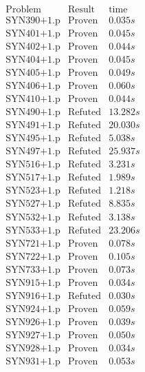 \documentclass[a4paper,11pt]{report}
\theoremstyle{definition}
\theoremstyle{definition}
\theoremstyle{definition}
\theoremstyle{definition}
\theoremstyle{definition}
\theoremstyle{definition}
\theoremstyle{definition}
\begin{document}
	\begin{minipage}{0.45\textwidth}
		\vspace*{-1.5cm}\[\begin{matrix}
			\text{Problem}&\text{Result}&\text{time}\\
			\text{SYN390+1.p}&\text{Proven}& 0.035 s\\
			\text{SYN401+1.p}&\text{Proven}& 0.045 s\\
			\text{SYN402+1.p}&\text{Proven}& 0.044 s\\
			\text{SYN404+1.p}&\text{Proven}& 0.045 s\\
			\text{SYN405+1.p}&\text{Proven}& 0.049 s\\
			\text{SYN406+1.p}&\text{Proven}& 0.060 s\\
			\text{SYN410+1.p}&\text{Proven}& 0.044 s\\
			\text{SYN490+1.p}&\text{Refuted}& 13.282 s\\
			\text{SYN491+1.p}&\text{Refuted}& 20.030 s\\
			\text{SYN495+1.p}&\text{Refuted}& 5.038 s\\
			\text{SYN497+1.p}&\text{Refuted}& 25.937 s\\
			\text{SYN516+1.p}&\text{Refuted}& 3.231 s\\
			\text{SYN517+1.p}&\text{Refuted}& 1.989 s\\
			\text{SYN523+1.p}&\text{Refuted}& 1.218 s\\
			\text{SYN527+1.p}&\text{Refuted}& 8.835 s\\
			\text{SYN532+1.p}&\text{Refuted}& 3.138 s\\
			\text{SYN533+1.p}&\text{Refuted}& 23.206 s\\
			\text{SYN721+1.p}&\text{Proven}& 0.078 s\\
			\text{SYN722+1.p}&\text{Proven}& 0.105 s\\
			\text{SYN733+1.p}&\text{Proven}& 0.073 s\\
			\text{SYN915+1.p}&\text{Proven}& 0.034 s\\
			\text{SYN916+1.p}&\text{Refuted}& 0.030 s\\
			\text{SYN924+1.p}&\text{Proven}& 0.059 s\\
			\text{SYN926+1.p}&\text{Proven}& 0.039 s\\
			\text{SYN927+1.p}&\text{Proven}& 0.050 s\\
			\text{SYN928+1.p}&\text{Proven}& 0.034 s\\
			\text{SYN931+1.p}&\text{Proven}& 0.053 s\\

\end{matrix}\]
\end{minipage}
\end{document}
